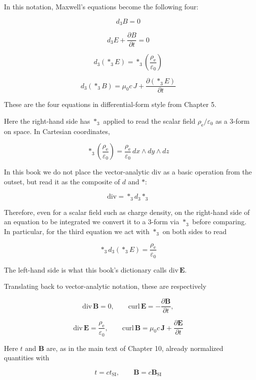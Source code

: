 In this notation, Maxwell's equations become the following four:

\[
d_3B=0
\]

\[
d_3E+\frac{\partial B}{\partial t}=0
\]

\[
d_3(\ast_3E)=\ast_3\left(\frac{\rho_{\mathrm e}}{\varepsilon_0}\right)
\]

\[
d_3(\ast_3B)=\mu_0 c\,J+\frac{\partial(\ast_3E)}{\partial t}
\]

These are the four equations in differential-form style from Chapter 5.

Here the right-hand side has \(\ast_3\) applied to read the scalar field
\(\rho_{\mathrm e}/\varepsilon_0\) as a \(3\)-form on space. In
Cartesian coordinates,

\[
\ast_3\left(\frac{\rho_{\mathrm e}}{\varepsilon_0}\right)=\frac{\rho_{\mathrm e}}{\varepsilon_0}\,dx\wedge dy\wedge dz
\]

In this book we do not place the vector-analytic \(\mathrm{div}\) as a
basic operation from the outset, but read it as the composite of \(d\)
and \(\ast\):

\[
\mathrm{div}=\ast_3 d_3\ast_3
\]

Therefore, even for a scalar field such as charge density, on the
right-hand side of an equation to be integrated we convert it to a
\(3\)-form via \(\ast_3\) before comparing. In particular, for the third
equation we act with \(\ast_3\) on both sides to read

\[
\ast_3d_3(\ast_3E)=\frac{\rho_{\mathrm e}}{\varepsilon_0}
\]

The left-hand side is what this book's dictionary calls
\(\mathrm{div}\,\mathbf E\).

Translating back to vector-analytic notation, these are respectively

\[
\mathrm{div}\,\mathbf B=0,
\qquad
\mathrm{curl}\,\mathbf E=-\frac{\partial\mathbf B}{\partial t},
\]

\[
\mathrm{div}\,\mathbf E=\frac{\rho_{\mathrm e}}{\varepsilon_0},
\qquad
\mathrm{curl}\,\mathbf B=\mu_0 c\,\mathbf J+\frac{\partial\mathbf E}{\partial t}
\]

Here \(t\) and \(\mathbf B\) are, as in the main text of Chapter 10,
already normalized quantities with

\[
t=ct_{\mathrm{SI}},
\qquad
\mathbf B=c\mathbf B_{\mathrm{SI}}
\]

